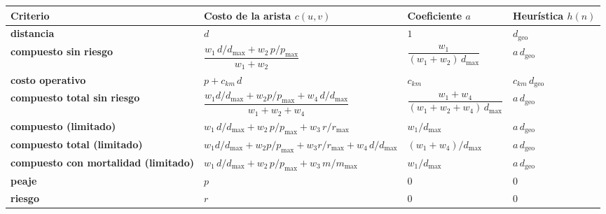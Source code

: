 \renewcommand{\arraystretch}{1.2}
\begin{tabular}{|>{\raggedright\arraybackslash}p{2.5cm}|>{\raggedright\arraybackslash}p{5.2cm}|>{\raggedright\arraybackslash}p{3.4cm}|>{\raggedright\arraybackslash}p{1.9cm}|}
\hline
\rowcolor{gray!20} \textbf{Criterio} & \textbf{Costo de la arista $c(u,v)$} & \textbf{Coeficiente $a$} & \textbf{Heurística $h(n)$} \\
\hline
\textbf{distancia} & $d$ & $1$ & $d_{\mathrm{geo}}$ \\
\hline
\textbf{compuesto sin riesgo} & $\dfrac{w_1\,d/d_{\max} + w_2\,p/p_{\max}}{w_1 + w_2}$ & $\dfrac{w_1}{(w_1 + w_2)\,d_{\max}}$ & $a\,d_{\mathrm{geo}}$ \\
\hline
\textbf{costo operativo} & $p + c_{km}\,d$ & $c_{km}$ & $c_{km}\,d_{\mathrm{geo}}$ \\
\hline
\textbf{compuesto total sin riesgo} & $\dfrac{w_1 d/d_{\max} + w_2 p/p_{\max} + w_4\,d/d_{\max}}{w_1 + w_2 + w_4}$ & $\dfrac{w_1 + w_4}{(w_1 + w_2 + w_4)\,d_{\max}}$ & $a\,d_{\mathrm{geo}}$ \\
\hline
\textbf{compuesto (limitado)} & $w_1\,d/d_{\max} + w_2\,p/p_{\max} + w_3\,r/r_{\max}$ & $w_1/d_{\max}$ & $a\,d_{\mathrm{geo}}$ \\
\hline
\textbf{compuesto total (limitado)} & $w_1 d/d_{\max} + w_2 p/p_{\max} + w_3 r/r_{\max} + w_4\,d/d_{\max}$ & $(w_1 + w_4)/d_{\max}$ & $a\,d_{\mathrm{geo}}$ \\
\hline
\textbf{compuesto con mortalidad (limitado)} & $w_1\,d/d_{\max} + w_2\,p/p_{\max} + w_3\,m/m_{\max}$ & $w_1/d_{\max}$ & $a\,d_{\mathrm{geo}}$ \\
\hline
\textbf{peaje} & $p$ & $0$ & $0$ \\
\hline
\textbf{riesgo} & $r$ & $0$ & $0$ \\
\hline
\end{tabular}
